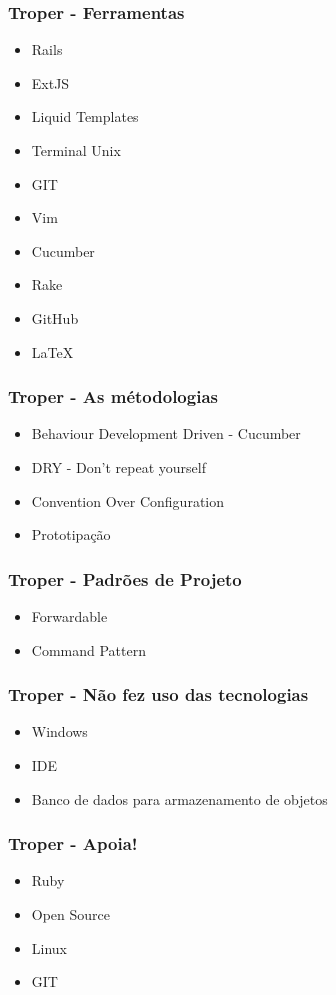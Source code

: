 \documentclass{beamer}
\begin{document}
\begin{frame} 
\frametitle{Troper - Ferramentas}
  \begin{itemize} 
    \item Rails
    \item ExtJS 
    \item Liquid Templates 
    \item Terminal Unix 
    \item GIT 
    \item Vim 
    \item Cucumber
    \item Rake 
    \item GitHub 
    \item LaTeX
  \end{itemize} 
\end{frame}

\begin{frame}
\frametitle{Troper - As métodologias}
  \begin{itemize} 
    \item Behaviour Development Driven - Cucumber
    \item DRY - Don't repeat yourself 
    \item Convention Over Configuration
    \item Prototipação 
  \end{itemize} 
\end{frame}

\begin{frame}
\frametitle{Troper - Padrões de Projeto}
  \begin{itemize} 
    \item Forwardable
    \item Command Pattern 
  \end{itemize} 
\end{frame}

\begin{frame} 
\frametitle{Troper - Não fez uso das tecnologias }
  \begin{itemize} 
    \item Windows 
    \item IDE
    \item Banco de dados para armazenamento de objetos
  \end{itemize} 
\end{frame} 

\begin{frame} 
\frametitle{Troper - Apoia!}
  \begin{itemize} 
    \item Ruby 
    \item Open Source 
    \item Linux 
    \item GIT 
  \end{itemize} 
\end{frame} 
\end{document}
